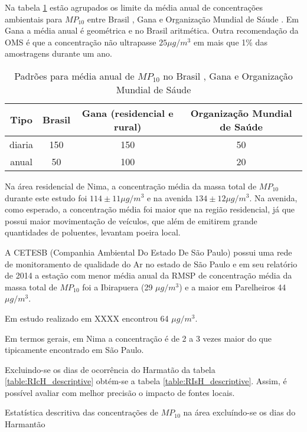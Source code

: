 Na tabela \ref{table:pm10standards} estão agrupados os limite da média anual de 
concentrações ambientais para $MP_{10}$ entre Brasil \citep{conama1990}, 
Gana \citep{epa2015} e Organização Mundial de Sáude \citep{who}. 
Em Gana a média anual é geométrica e no Brasil aritmética.
Outra recomendação da OMS é que a concentração não ultrapasse $25 \mu g/m^3$ 
em mais que 1\% das amostragens durante um ano. 

\begin{table}[H]
  \centering
      \begin{tabular}{cccc}
     \hline
   Tipo & Brasil & Gana (residencial e rural) & Organização Mundial de Saúde \\
     \hline
   diaria & 150 & 150 &  50 \\
     anual &  50 & 100 &  20 \\
      \hline
  \end{tabular}
  \caption{Padrões para média anual de $MP_{10}$ no Brasil \citep{conama1990}, 
           Gana \citep{epa2015} e 
           Organização Mundial de Sáude \citep{who}
           \label{table:pm10standards}}
\end{table}

Na área residencial de Nima, a concentração média da massa total de $MP_{10}$ 
durante este estudo foi $114\pm 11 \mu g / m^3$ e na avenida 
$134\pm 12 \mu g / m^3$. Na avenida, como esperado, a concentração média 
foi maior que na região residencial, já que possui maior movimentação de 
veículos, que além de emitirem grande quantidades de poluentes, levantam 
poeira local. 

A CETESB (Companhia Ambiental Do Estado De São Paulo) possui uma rede de 
monitoramento de qualidade do Ar no estado de São Paulo e em seu relatório 
de 2014 \citep{cetesb2014} a estação com menor média anual da RMSP 
de concentração média da massa total de $MP_{10}$ foi a Ibirapuera 
(29 $\mu g / m^3$) e a maior em Parelheiros 44 $\mu g / m^3$.  

Em estudo realizado em XXXX \cite{souza2014} encontrou 64 $\mu g / m^3$.

Em termos gerais, em Nima a concentração é de 2 a 3 vezes maior do que 
tipicamente encontrado em São Paulo. 

Excluindo-se os dias de ocorrência do Harmatão da tabela 
\ref{table:RIcH_descriptive} obtém-se a tabela \ref{table:RIsH_descriptive}.
Assim, é possível avaliar com melhor precisão o impacto de fontes locais.  

\begin{table}[H]
  \centering
    
  \caption{Estatística descritiva das concentrações de  $MP_{10}$ na área 
           \residencial excluíndo-se os dias do Harmantão
            \label{table:RIsH_descriptive}}
\end{table}

